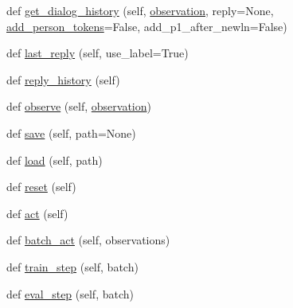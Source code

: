 \begin{DoxyCompactItemize}
def \hyperlink{classparlai_1_1agents_1_1legacy__agents_1_1seq2seq_1_1torch__agent__v1_1_1TorchAgent_a8984452b8b4e6194625530aeae49b243}{get\+\_\+dialog\+\_\+history} (self, \hyperlink{classparlai_1_1agents_1_1legacy__agents_1_1seq2seq_1_1torch__agent__v1_1_1TorchAgent_a04fa334c086cf9afa815a44f1948e625}{observation}, reply=None, \hyperlink{classparlai_1_1agents_1_1legacy__agents_1_1seq2seq_1_1torch__agent__v1_1_1TorchAgent_a81f970d715f2525ad342330a28703c5c}{add\+\_\+person\+\_\+tokens}=False, add\+\_\+p1\+\_\+after\+\_\+newln=False)
\item 
def \hyperlink{classparlai_1_1agents_1_1legacy__agents_1_1seq2seq_1_1torch__agent__v1_1_1TorchAgent_abf7a50ea0eb319737123d2e46fde4c0f}{last\+\_\+reply} (self, use\+\_\+label=True)
\item 
def \hyperlink{classparlai_1_1agents_1_1legacy__agents_1_1seq2seq_1_1torch__agent__v1_1_1TorchAgent_ae4b2346c35e214a8028eb83d1fc5ffd7}{reply\+\_\+history} (self)
\item 
def \hyperlink{classparlai_1_1agents_1_1legacy__agents_1_1seq2seq_1_1torch__agent__v1_1_1TorchAgent_a0eb23a78aea413ae4f90ce0628179920}{observe} (self, \hyperlink{classparlai_1_1agents_1_1legacy__agents_1_1seq2seq_1_1torch__agent__v1_1_1TorchAgent_a04fa334c086cf9afa815a44f1948e625}{observation})
\item 
def \hyperlink{classparlai_1_1agents_1_1legacy__agents_1_1seq2seq_1_1torch__agent__v1_1_1TorchAgent_a4a01defa1d669571f574fcfe021776a8}{save} (self, path=None)
\item 
def \hyperlink{classparlai_1_1agents_1_1legacy__agents_1_1seq2seq_1_1torch__agent__v1_1_1TorchAgent_a6d71ad7997e048e4f4f7d957fae64ac5}{load} (self, path)
\item 
def \hyperlink{classparlai_1_1agents_1_1legacy__agents_1_1seq2seq_1_1torch__agent__v1_1_1TorchAgent_a93e935c0d2d589d8990ff14d6e528c4d}{reset} (self)
\item 
def \hyperlink{classparlai_1_1agents_1_1legacy__agents_1_1seq2seq_1_1torch__agent__v1_1_1TorchAgent_a3ab251071823f34358a569c1c2a11bf9}{act} (self)
\item 
def \hyperlink{classparlai_1_1agents_1_1legacy__agents_1_1seq2seq_1_1torch__agent__v1_1_1TorchAgent_af3929c1bedc50a48dcf8d1184321f4f5}{batch\+\_\+act} (self, observations)
\item 
def \hyperlink{classparlai_1_1agents_1_1legacy__agents_1_1seq2seq_1_1torch__agent__v1_1_1TorchAgent_aff9cc5c105bbf154075aa83e288582ca}{train\+\_\+step} (self, batch)
\item 
def \hyperlink{classparlai_1_1agents_1_1legacy__agents_1_1seq2seq_1_1torch__agent__v1_1_1TorchAgent_a801f2b9a359201fd0a395ab61fd61806}{eval\+\_\+step} (self, batch)
\end{DoxyCompactItemize}
